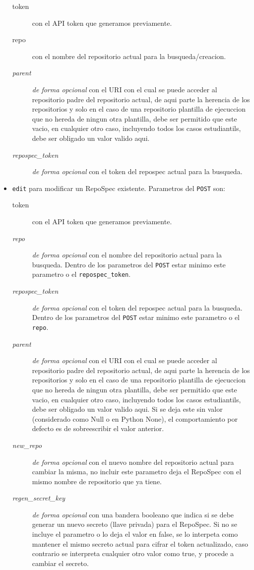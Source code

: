 \begin{itemize}
    \begin{description}
    	\item[token] con el API token que generamos previamente.
        \item[repo] con el nombre del repositorio actual para la busqueda/creacion.
        \item[\textit{parent}] \textit{de forma opcional} con el URI con el cual se puede acceder al repositorio padre del repositorio actual, de aqui parte la herencia de los repositorios y solo en el caso de una repositorio plantilla de ejecuccion que no hereda de ningun otra plantilla, debe ser permitido que este vacio, en cualquier otro caso, incluyendo todos los casos estudiantils, debe ser obligado un valor valido aqui.
        \item[\textit{repospec\_token}] \textit{de forma opcional} con el token del repospec actual para la busqueda.
    \end{description}
    \item \texttt{edit} para modificar un RepoSpec existente. Parametros del \texttt{POST} son:
    \begin{description}
    	\item[token] con el API token que generamos previamente.
        \item[\textit{repo}] \textit{de forma opcional} con el nombre del repositorio actual para la busqueda. Dentro de los parametros del \texttt{POST} estar minimo este parametro o el \texttt{repospec\_token}.
        \item[\textit{repospec\_token}] \textit{de forma opcional} con el token del repospec actual para la busqueda. Dentro de los parametros del \texttt{POST} estar minimo este parametro o el \texttt{repo}.
        \item[\textit{parent}] \textit{de forma opcional} con el URI con el cual se puede acceder al repositorio padre del repositorio actual, de aqui parte la herencia de los repositorios y solo en el caso de una repositorio plantilla de ejecuccion que no hereda de ningun otra plantilla, debe ser permitido que este vacio, en cualquier otro caso, incluyendo todos los casos estudiantils, debe ser obligado un valor valido aqui. Si se deja este sin valor (considerado como Null o en Python None), el comportamiento por defecto es de sobreescribir el valor anterior.
        \item[\textit{new\_repo}] \textit{de forma opcional} con el nuevo nombre del repositorio actual para cambiar la misma, no incluir este parametro deja el RepoSpec con el mismo nombre de repositorio que ya tiene.
        \item[\textit{regen\_secret\_key}] \textit{de forma opcional} con una bandera booleano que indica si se debe generar un nuevo secreto (llave privada) para el RepoSpec. Si no se incluye el parametro o lo deja el valor en false, se lo interpeta como mantener el mismo secreto actual para cifrar el token actualizado, caso contrario se interpreta cualquier otro valor como true, y procede a cambiar el secreto. 
    \end{description}
\end{itemize}
